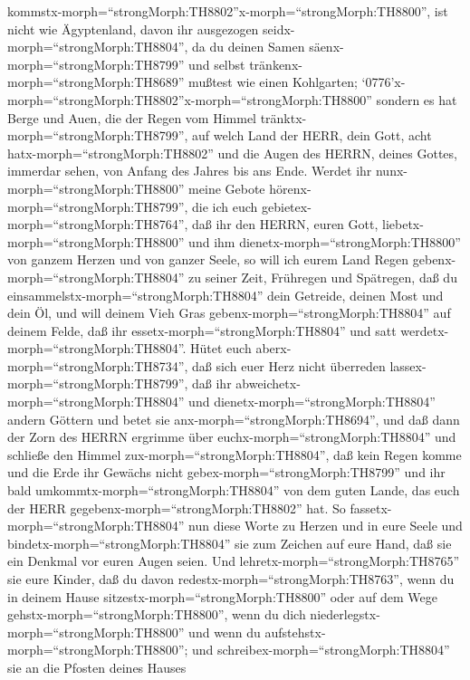 kommstx-morph=``strongMorph:TH8802''x-morph=``strongMorph:TH8800'', ist
nicht wie Ägyptenland, davon ihr ausgezogen
seidx-morph=``strongMorph:TH8804'', da du deinen Samen
säenx-morph=``strongMorph:TH8799'' und selbst
tränkenx-morph=``strongMorph:TH8689'' mußtest wie einen Kohlgarten;
`0776'x-morph=``strongMorph:TH8802''x-morph=``strongMorph:TH8800''
sondern es hat Berge und Auen, die der Regen vom Himmel
tränktx-morph=``strongMorph:TH8799'',  auf welch Land der
HERR, dein Gott, acht hatx-morph=``strongMorph:TH8802'' und die Augen
des HERRN, deines Gottes, immerdar sehen, von Anfang des Jahres bis ans
Ende.  Werdet ihr nunx-morph=``strongMorph:TH8800'' meine
Gebote hörenx-morph=``strongMorph:TH8799'', die ich euch
gebietex-morph=``strongMorph:TH8764'', daß ihr den HERRN, euren Gott,
liebetx-morph=``strongMorph:TH8800'' und ihm
dienetx-morph=``strongMorph:TH8800'' von ganzem Herzen und von ganzer
Seele,  so will ich eurem Land Regen
gebenx-morph=``strongMorph:TH8804'' zu seiner Zeit, Frühregen und
Spätregen, daß du einsammelstx-morph=``strongMorph:TH8804'' dein
Getreide, deinen Most und dein Öl,  und will deinem Vieh
Gras gebenx-morph=``strongMorph:TH8804'' auf deinem Felde, daß ihr
essetx-morph=``strongMorph:TH8804'' und satt
werdetx-morph=``strongMorph:TH8804''.  Hütet euch
aberx-morph=``strongMorph:TH8734'', daß sich euer Herz nicht überreden
lassex-morph=``strongMorph:TH8799'', daß ihr
abweichetx-morph=``strongMorph:TH8804'' und
dienetx-morph=``strongMorph:TH8804'' andern Göttern und betet sie
anx-morph=``strongMorph:TH8694'',  und daß dann der Zorn
des HERRN ergrimme über euchx-morph=``strongMorph:TH8804'' und schließe
den Himmel zux-morph=``strongMorph:TH8804'', daß kein Regen komme und
die Erde ihr Gewächs nicht gebex-morph=``strongMorph:TH8799'' und ihr
bald umkommtx-morph=``strongMorph:TH8804'' von dem guten Lande, das euch
der HERR gegebenx-morph=``strongMorph:TH8802'' hat.  So
fassetx-morph=``strongMorph:TH8804'' nun diese Worte zu Herzen und in
eure Seele und bindetx-morph=``strongMorph:TH8804'' sie zum Zeichen auf
eure Hand, daß sie ein Denkmal vor euren Augen seien.  Und
lehretx-morph=``strongMorph:TH8765'' sie eure Kinder, daß du davon
redestx-morph=``strongMorph:TH8763'', wenn du in deinem Hause
sitzestx-morph=``strongMorph:TH8800'' oder auf dem Wege
gehstx-morph=``strongMorph:TH8800'', wenn du dich
niederlegstx-morph=``strongMorph:TH8800'' und wenn du
aufstehstx-morph=``strongMorph:TH8800'';  und
schreibex-morph=``strongMorph:TH8804'' sie an die Pfosten deines Hauses
